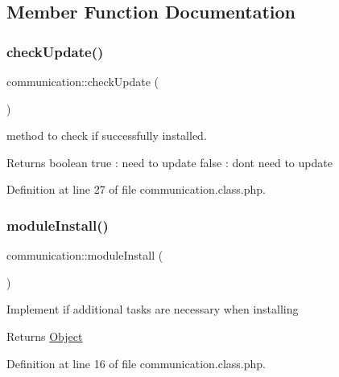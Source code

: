 \subsection{Member Function Documentation}
\hypertarget{classcommunication_a76f080661ce31bd72c02bb41c8d5714f}{}\label{classcommunication_a76f080661ce31bd72c02bb41c8d5714f} 
\subsubsection{\texorpdfstring{check\+Update()}{checkUpdate()}}
{\footnotesize\ttfamily communication\+::check\+Update (\begin{DoxyParamCaption}{ }\end{DoxyParamCaption})}

method to check if successfully installed. \begin{DoxyReturn}{Returns}
boolean true \+: need to update false \+: don\textquotesingle{}t need to update 
\end{DoxyReturn}


Definition at line 27 of file communication.\+class.\+php.

\hypertarget{classcommunication_aa976c35c62e0e28be160893825f4e7a6}{}\label{classcommunication_aa976c35c62e0e28be160893825f4e7a6} 
\subsubsection{\texorpdfstring{module\+Install()}{moduleInstall()}}
{\footnotesize\ttfamily communication\+::module\+Install (\begin{DoxyParamCaption}{ }\end{DoxyParamCaption})}

Implement if additional tasks are necessary when installing \begin{DoxyReturn}{Returns}
\hyperlink{classObject}{Object} 
\end{DoxyReturn}


Definition at line 16 of file communication.\+class.\+php.

\hypertarget{classcommunication_a10cbff2a979531d279954a22b8455061}{}\label{classcommunication_a10cbff2a979531d279954a22b8455061} 
